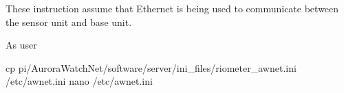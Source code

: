 These instruction assume that Ethernet is being used to communicate between the
sensor unit and base unit.

As user \rootUser
\begin{Cmd}[fontsize=\relsize{-1.75}]
cp \mytilde{}pi/AuroraWatchNet/software/server/ini_files/riometer_awnet.ini /etc/awnet.ini
nano /etc/awnet.ini
\end{Cmd}
